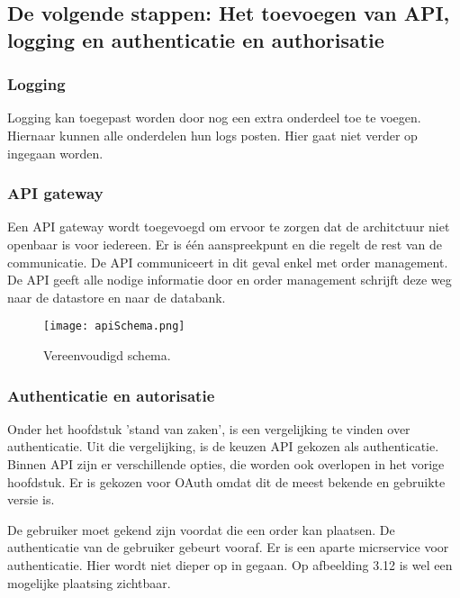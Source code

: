 \subsection{De volgende stappen: Het toevoegen van API, logging en authenticatie en authorisatie}
\subsubsection{Logging}
Logging kan toegepast worden door nog een extra onderdeel toe te voegen. Hiernaar kunnen alle onderdelen hun logs posten. Hier gaat niet verder op ingegaan worden. 

\subsubsection{API gateway}
Een API gateway wordt toegevoegd om ervoor te zorgen dat de architctuur niet openbaar is voor iedereen. Er is één aanspreekpunt en die regelt de rest van de communicatie.
De API communiceert in dit geval enkel met order management. De API geeft alle nodige informatie door en order management schrijft deze weg naar de datastore en naar de databank.
\begin{figure}[h]
	\texttt{[image: apiSchema.png]}
	\caption{Vereenvoudigd schema.}
	\centering
\end{figure}

\subsubsection{Authenticatie en autorisatie}
Onder het hoofdstuk 'stand van zaken', is een vergelijking te vinden over authenticatie. Uit die vergelijking, is de keuzen API gekozen als authenticatie. Binnen API zijn er verschillende opties, die worden ook overlopen in het vorige hoofdstuk. Er is gekozen voor OAuth omdat dit de meest bekende en gebruikte versie is.

De gebruiker moet gekend zijn voordat die een order kan plaatsen. De authenticatie van de gebruiker gebeurt vooraf. Er is een aparte micrservice voor authenticatie. Hier wordt niet dieper op in gegaan.
Op afbeelding 3.12 is wel een mogelijke plaatsing zichtbaar.


